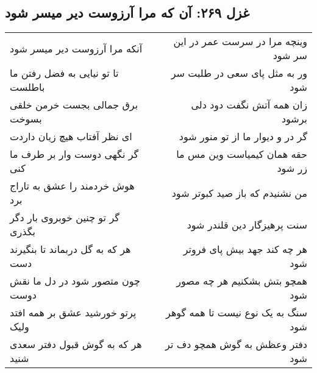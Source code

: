 \begin{center}
\section*{غزل ۲۶۹: آن که مرا آرزوست دیر میسر شود}
\label{sec:269}
\begin{longtable}{l p{0.5cm} r}
آنکه مرا آرزوست دیر میسر شود
&&
وینچه مرا در سرست عمر در این سر شود
\\
تا تو نیایی به فضل رفتن ما باطلست
&&
ور به مثل پای سعی در طلبت سر شود
\\
برق جمالی بجست خرمن خلقی بسوخت
&&
زان همه آتش نگفت دود دلی برشود
\\
ای نظر آفتاب هیچ زیان داردت
&&
گر در و دیوار ما از تو منور شود
\\
گر نگهی دوست وار بر طرف ما کنی
&&
حقه همان کیمیاست وین مس ما زر شود
\\
هوش خردمند را عشق به تاراج برد
&&
من نشنیدم که باز صید کبوتر شود
\\
گر تو چنین خوبروی بار دگر بگذری
&&
سنت پرهیزگار دین قلندر شود
\\
هر که به گل دربماند تا بنگیرند دست
&&
هر چه کند جهد بیش پای فروتر شود
\\
چون متصور شود در دل ما نقش دوست
&&
همچو بتش بشکنیم هر چه مصور شود
\\
پرتو خورشید عشق بر همه افتد ولیک
&&
سنگ به یک نوع نیست تا همه گوهر شود
\\
هر که به گوش قبول دفتر سعدی شنید
&&
دفتر وعظش به گوش همچو دف تر شود
\\
\end{longtable}
\end{center}

